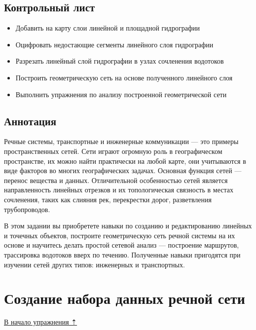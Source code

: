 \documentclass[12pt,]{book}
\providecommand{\tightlist}{%
  \setlength{\itemsep}{0pt}\setlength{\parskip}{0pt}}
\begin{document}
\hypertarget{network-hydro-control}{%
\subsection{Контрольный лист}\label{network-hydro-control}}

\begin{itemize}
\tightlist
\item
  Добавить на карту слои линейной и площадной гидрографии
\item
  Оцифровать недостающие сегменты линейного слоя гидрографии
\item
  Разрезать линейный слой гидрографии в узлах сочленения водотоков
\item
  Построить геометрическую сеть на основе полученного линейного слоя
\item
  Выполнить упражнения по анализу построенной геометрической сети
\end{itemize}

\hypertarget{network-hydro-annotation}{%
\subsection{Аннотация}\label{network-hydro-annotation}}

Речные системы, транспортные и инженерные коммуникации --- это примеры пространственных сетей. Сети играют огромную роль в географическом пространстве, их можно найти практически на любой карте, они учитываются в виде факторов во многих географических задачах. Основная функция сетей --- перенос вещества и данных. Отличительной особенностью сетей является направленность линейных отрезков и их топологическая связность в местах сочленения, таких как слияния рек, перекрестки дорог, разветвления трубопроводов.

В этом задании вы приобретете навыки по созданию и редактированию линейных и точечных объектов, построите геометрическую сеть речной системы на их основе и научитесь делать простой сетевой анализ --- построение маршрутов, трассировка водотоков вверх по течению. Полученные навыки пригодятся при изучении сетей других типов: инженерных и транспортных.

\hypertarget{network-hydro-dataset}{%
\section{Создание набора данных речной сети}\label{network-hydro-dataset}}

\protect\hyperlink{network-hydro}{В начало упражнения ⇡}
\end{document}

